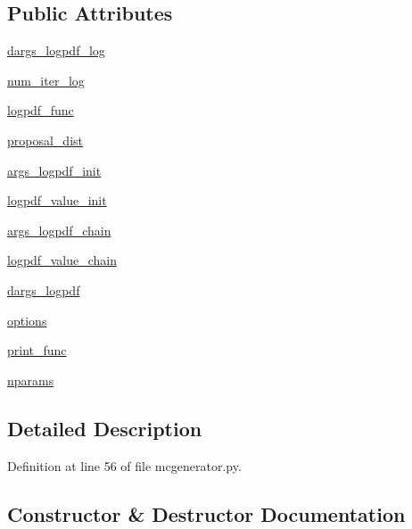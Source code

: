 \subsection*{Public Attributes}
\begin{DoxyCompactItemize}
\item 
\hyperlink{classmcgenerator_1_1MCgenerator_ae689337b11a6a27b5ca1f85a51074356}{dargs\+\_\+logpdf\+\_\+log}
\item 
\hyperlink{classmcgenerator_1_1MCgenerator_aacea491f7550aa73af1576e1c0576ac9}{num\+\_\+iter\+\_\+log}
\item 
\hyperlink{classmcgenerator_1_1MCgenerator_af1c3264bf8854ee1c3e8ce1d56e3ba41}{logpdf\+\_\+func}
\item 
\hyperlink{classmcgenerator_1_1MCgenerator_a637be1c5c1878a2f2c79004f6c0c74d5}{proposal\+\_\+dist}
\item 
\hyperlink{classmcgenerator_1_1MCgenerator_aaa09cf8b31cac60f08738f35fdd702e4}{args\+\_\+logpdf\+\_\+init}
\item 
\hyperlink{classmcgenerator_1_1MCgenerator_ae7b27cb76f9c582c6fea849549426ef9}{logpdf\+\_\+value\+\_\+init}
\item 
\hyperlink{classmcgenerator_1_1MCgenerator_acf87301fa092616f385053a1a607e30a}{args\+\_\+logpdf\+\_\+chain}
\item 
\hyperlink{classmcgenerator_1_1MCgenerator_a5580d6a33e1e8875aff14c40368e0dd3}{logpdf\+\_\+value\+\_\+chain}
\item 
\hyperlink{classmcgenerator_1_1MCgenerator_ac265e882de548a3a059c608ae9500444}{dargs\+\_\+logpdf}
\item 
\hyperlink{classmcgenerator_1_1MCgenerator_a8c2303e354e36c0e72973e5ca25ad7b5}{options}
\item 
\hyperlink{classmcgenerator_1_1MCgenerator_a600cd0b6d88f4300bff317584941bab3}{print\+\_\+func}
\item 
\hyperlink{classmcgenerator_1_1MCgenerator_a13990c0501261a110d38ba53b447d332}{nparams}
\end{DoxyCompactItemize}


\subsection{Detailed Description}


Definition at line 56 of file mcgenerator.\+py.



\subsection{Constructor \& Destructor Documentation}
\mbox{\label{classmcgenerator_1_1MCgenerator_a7e1f401528dcb7adae97ef6c56a26e33}} 
